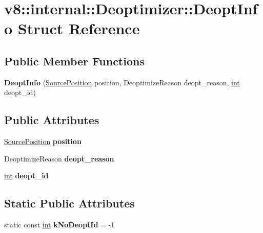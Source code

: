 \hypertarget{structv8_1_1internal_1_1Deoptimizer_1_1DeoptInfo}{}\section{v8\+:\+:internal\+:\+:Deoptimizer\+:\+:Deopt\+Info Struct Reference}
\label{structv8_1_1internal_1_1Deoptimizer_1_1DeoptInfo}
\subsection*{Public Member Functions}
\begin{DoxyCompactItemize}
\item 
\mbox{\label{structv8_1_1internal_1_1Deoptimizer_1_1DeoptInfo_aeb0824f889da498f555513ba9fef751f}} 
{\bfseries Deopt\+Info} (\mbox{\hyperlink{classv8_1_1internal_1_1SourcePosition}{Source\+Position}} position, Deoptimize\+Reason deopt\+\_\+reason, \mbox{\hyperlink{classint}{int}} deopt\+\_\+id)
\end{DoxyCompactItemize}
\subsection*{Public Attributes}
\begin{DoxyCompactItemize}
\item 
\mbox{\label{structv8_1_1internal_1_1Deoptimizer_1_1DeoptInfo_a5ed8775af7802e50658d4ebb29961630}} 
\mbox{\hyperlink{classv8_1_1internal_1_1SourcePosition}{Source\+Position}} {\bfseries position}
\item 
\mbox{\label{structv8_1_1internal_1_1Deoptimizer_1_1DeoptInfo_ade6c10911b0218f9ff9bc09c399b1d9c}} 
Deoptimize\+Reason {\bfseries deopt\+\_\+reason}
\item 
\mbox{\label{structv8_1_1internal_1_1Deoptimizer_1_1DeoptInfo_a4b605616a7de0d0fbb012b9ccfcb32b1}} 
\mbox{\hyperlink{classint}{int}} {\bfseries deopt\+\_\+id}
\end{DoxyCompactItemize}
\subsection*{Static Public Attributes}
\begin{DoxyCompactItemize}
\item 
\mbox{\label{structv8_1_1internal_1_1Deoptimizer_1_1DeoptInfo_a03f5642e60636c9024f12ee7bf35362e}} 
static const \mbox{\hyperlink{classint}{int}} {\bfseries k\+No\+Deopt\+Id} = -\/1
\end{DoxyCompactItemize}


